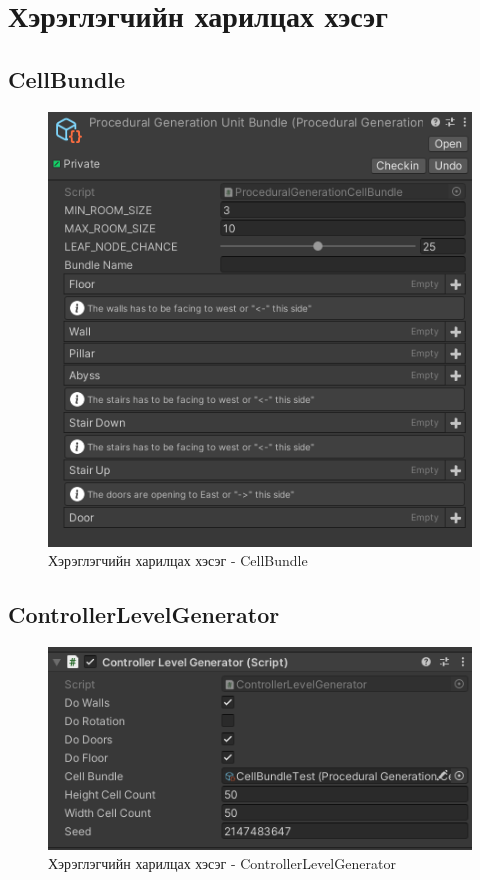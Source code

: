 \section{Хэрэглэгчийн харилцах хэсэг}

\subsection{CellBundle}

\begin{figure}[ht]
	\centering
	\includegraphics[width=\textwidth/2]{./images/user_interface_cell_bundle.png}
	\caption{Хэрэглэгчийн харилцах хэсэг - CellBundle}
	\label{fig:UserInterfaceCellBundle}
\end{figure}


\subsection{ControllerLevelGenerator}

\begin{figure}[hb]
	\centering
	\includegraphics[width=\textwidth/2]{./images/user_interface_controller_level_generator.png}
	\caption{Хэрэглэгчийн харилцах хэсэг - ControllerLevelGenerator}
	\label{fig:UserInterfaceControllerLevelGenerator}
\end{figure}

